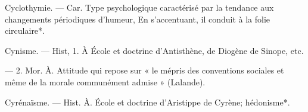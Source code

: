 Cyclothymie. — Car. Type psychologique caractérisé par la tendance
aux changements périodiques d’humeur, En s’accentuant, il conduit à
la folie circulaire*.

Cynisme. — Hist, 1. À École et doctrine d’Antisthène, de Diogène de
Sinope, etc.

— 2. Mor. À. Attitude qui repose
sur « le mépris des conventions sociales et même de la morale communément admise » (Lalande).

Cyrénaïsme. — Hist. À. École et doctrine d’Aristippe de Cyrène; hédonisme*.

